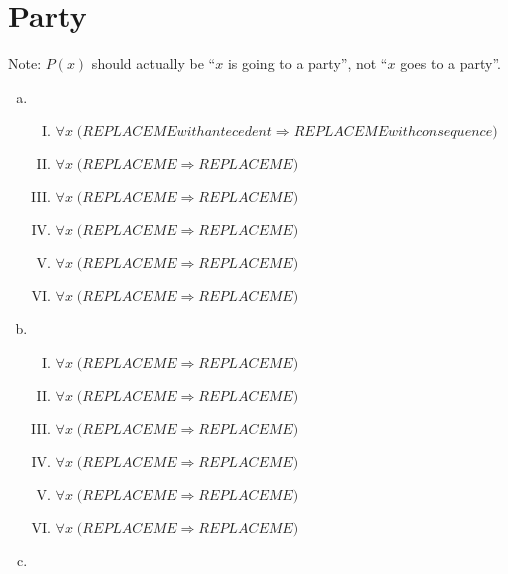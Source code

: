 \documentclass{article}
\renewcommand{\implies}{\Rightarrow}    %
\begin{document}
\section{Party}
\newcommand{\partyrule}[2]{\forall x \; \big(#1 \implies #2\big)}
Note: $P(x)$ should actually be ``$x$ is going to a party'', not ``$x$ goes to a party''.

\begin{enumerate}[(a)]
    \item \begin{enumerate}[(I)]
              \item $\partyrule{REPLACE ME with antecedent}{REPLACE ME with consequence}$
              \item $\partyrule{REPLACE ME}{REPLACE ME}$
              \item $\partyrule{REPLACE ME}{REPLACE ME}$
              \item $\partyrule{REPLACE ME}{REPLACE ME}$
              \item $\partyrule{REPLACE ME}{REPLACE ME}$
              \item $\partyrule{REPLACE ME}{REPLACE ME}$
          \end{enumerate}

    \item \begin{enumerate}[(I)]
              \item $\partyrule{REPLACE ME}{REPLACE ME}$
              \item $\partyrule{REPLACE ME}{REPLACE ME}$
              \item $\partyrule{REPLACE ME}{REPLACE ME}$
              \item $\partyrule{REPLACE ME}{REPLACE ME}$
              \item $\partyrule{REPLACE ME}{REPLACE ME}$
              \item $\partyrule{REPLACE ME}{REPLACE ME}$
          \end{enumerate}

    \item

\end{enumerate}
\end{document}
